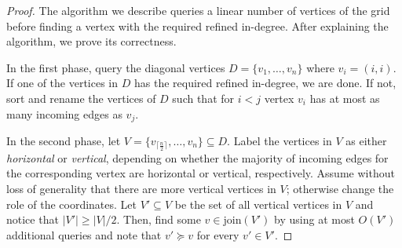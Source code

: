 \documentclass[runningheads,a4paper]{llncs}
\newcommand{\indegree}{refined in-degree\xspace}
\newcommand{\join}{\mbox{join}\xspace}
\begin{document}
\begin{proof}
The algorithm we describe queries a linear number of vertices of the grid before finding a vertex with the required \indegree. 
After explaining the algorithm, we prove its correctness.

In the first phase, query the diagonal vertices $D = \{v_1,\ldots, v_n\}$ where $v_i = (i,i)$.
If one of the vertices in $D$ has the required \indegree, we are done. 
If not, sort and rename the vertices of $D$ such that for $i < j$ vertex $v_i$ has at most as many incoming edges as $v_j$. 

In the second phase, let $V = \{v_{\lceil \frac{n}{2} \rceil},\ldots,v_n\} \subseteq D$.
Label the vertices in $V$ as either \emph{horizontal}  or \emph{vertical}, depending on whether the majority of incoming edges for the corresponding vertex are horizontal  or vertical, respectively. 
Assume without loss of generality that there are more vertical vertices in $V$; otherwise change the role of the coordinates. 
Let $V' \subseteq V$ be the set of all vertical vertices in $V$ and notice that $|V'| \geq |V|/2$.
Then, find some $v \in \join(V')$ by using at most $O(V')$ additional queries and note that $v' \succeq v$ for every $v' \in V'$.


\end{proof}
\end{document}

